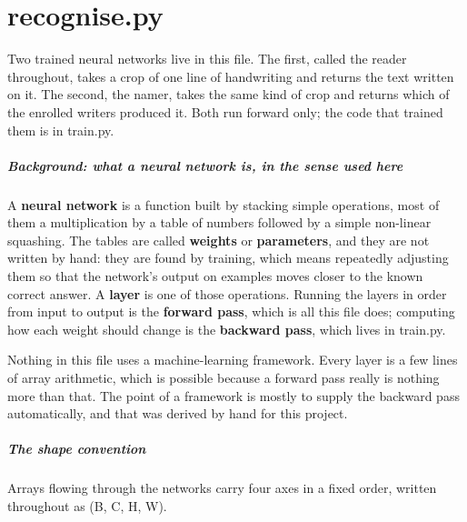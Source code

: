 
\chapter{recognise.py}
Two trained neural networks live in this file. The first, called the reader throughout, takes a crop of one line of handwriting and returns the text written on it. The second, the namer, takes the same kind of crop and returns which of the enrolled writers produced it. Both run forward only; the code that trained them is in train.py.


\paragraph{Background: what a neural network is, in the sense used here}
A \textbf{neural network} is a function built by stacking simple operations, most of them a multiplication by a table of numbers followed by a simple non-linear squashing. The tables are called \textbf{weights} or \textbf{parameters}, and they are not written by hand: they are found by training, which means repeatedly adjusting them so that the network's output on examples moves closer to the known correct answer. A \textbf{layer} is one of those operations. Running the layers in order from input to output is the \textbf{forward pass}, which is all this file does; computing how each weight should change is the \textbf{backward pass}, which lives in train.py.

Nothing in this file uses a machine-learning framework. Every layer is a few lines of array arithmetic, which is possible because a forward pass really is nothing more than that. The point of a framework is mostly to supply the backward pass automatically, and that was derived by hand for this project.


\paragraph{The shape convention}
Arrays flowing through the networks carry four axes in a fixed order, written throughout as (B, C, H, W).


